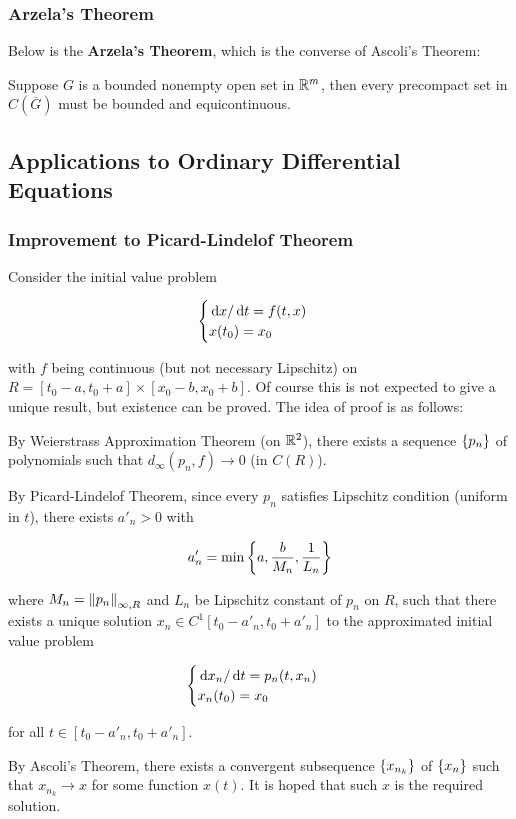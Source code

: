 \documentclass[a4paper,12pt]{article}
\begin{document}
\subsubsection{Arzela's Theorem}
Below is the \textbf{Arzela's Theorem}, which is the converse of Ascoli's Theorem:\n

\begin{thm}
  Suppose $G$ is a bounded nonempty open set in $\mathbb{R}^{m}$, then every precompact set in $C(\overline{G})$ must be bounded and equicontinuous.
\end{thm}

\subsection{Applications to Ordinary Differential Equations}
\subsubsection{Improvement to Picard-Lindelof Theorem}
Consider the initial value problem

$$\begin{cases}
  \,\mathrm{d} x/\,\mathrm{d} t=f(t,x)\\
  x(t_{0})=x_{0}
\end{cases}$$\s

with $f$ being continuous (but not necessary Lipschitz) on $R=[t_{0}-a,t_{0}+a]\times[x_{0}-b,x_{0}+b]$. Of course this is not expected to give a unique result, but existence can be proved. The idea of proof is as follows:

\begin{nlist}
  \item By Weierstrass Approximation Theorem (on $\mathbb{R}^{2}$), there exists a sequence $\left\{ p_{n}\right\}$ of polynomials such that $d_{\infty}(p_{n},f)\to 0$ (in $C(R)$).
  \item By Picard-Lindelof Theorem, since every $p_{n}$ satisfies Lipschitz condition (uniform in $t$), there exists $a'_{n}>0$ with
  
  $$a'_{n}=\min\left\{ a,\frac{b}{M_{n}},\frac{1}{L_{n}}\right\}$$\s

  where $M_{n}=\left\| p_{n}\right\|_{\infty,R}$ and $L_{n}$ be Lipschitz constant of $p_{n}$ on $R$, such that there exists a unique solution $x_{n}\in C^{1}[t_{0}-a'_{n},t_{0}+a'_{n}]$ to the approximated initial value problem

  $$\begin{cases}
    \,\mathrm{d} x_{n}/\,\mathrm{d} t=p_{n}(t,x_{n})\\
    x_{n}(t_{0})=x_{0}
  \end{cases}$$\s

  for all $t\in[t_{0}-a'_{n},t_{0}+a'_{n}]$.
  \item By Ascoli's Theorem, there exists a convergent subsequence $\left\{ x_{n_{k}}\right\}$ of $\left\{ x_{n}\right\}$ such that $x_{n_{k}}\to x$ for some function $x(t)$. It is hoped that such $x$ is the required solution.
\end{nlist}
\end{document}
